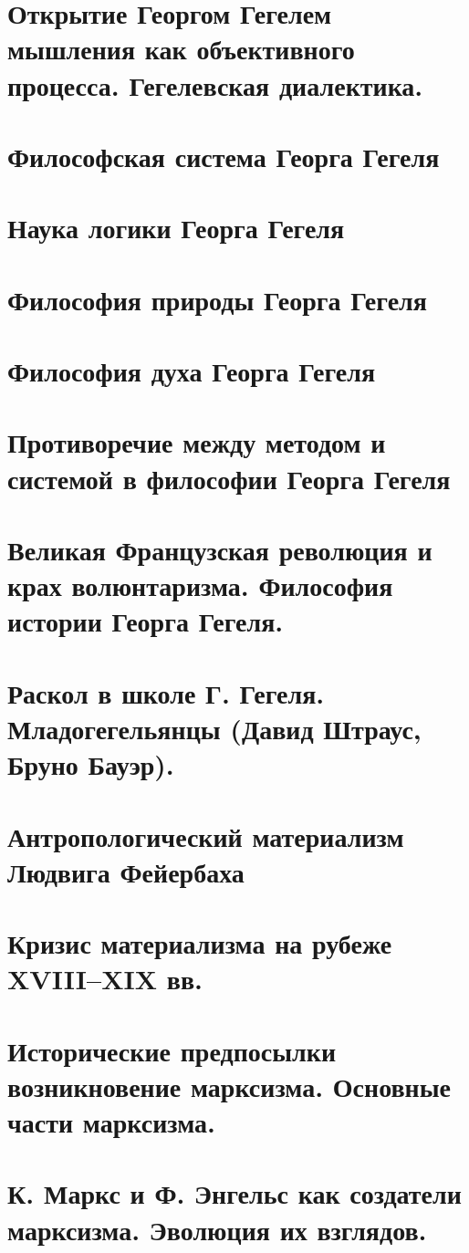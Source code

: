 \section{Открытие Георгом Гегелем мышления как объективного процесса. Гегелевская диалектика.}
\section{Философская система Георга Гегеля}
\section{Наука логики Георга Гегеля}
\section{Философия природы Георга Гегеля}
\section{Философия духа Георга Гегеля}
\section{Противоречие между методом и системой в философии Георга Гегеля}
\section{Великая Французская революция и крах волюнтаризма.  Философия истории Георга Гегеля. }

\section{Раскол в школе Г. Гегеля. Младогегельянцы (Давид Штраус, Бруно Бауэр).}
\section{Антропологический материализм Людвига Фейербаха}
\section{Кризис материализма на рубеже XVIII–XIX вв.}
\section{Исторические предпосылки возникновение марксизма. Основные части марксизма.}
\section{К. Маркс и Ф. Энгельс как создатели марксизма. Эволюция их взглядов.}

